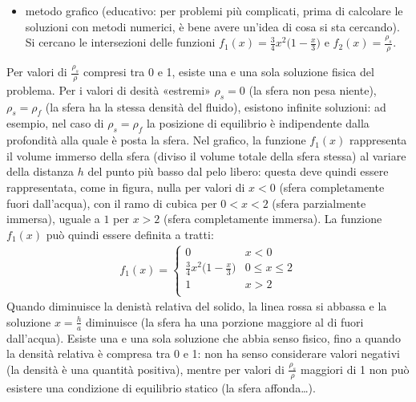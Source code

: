\documentclass[letterpaper,10pt,italian]{jupyterBook}
\begin{document}
\begin{itemize}
\begin{itemize}
\begin{sphinxVerbatim}[commandchars=\\\{\}]
x          res 
1.0000    \PYGZhy{}3.437475e\PYGZhy{}01  
1.4583    \PYGZhy{}2.406993e\PYGZhy{}02  
1.4990    \PYGZhy{}5.841602e\PYGZhy{}04  
1.5000    \PYGZhy{}4.027539e\PYGZhy{}07  
1.5000    \PYGZhy{}1.924017e\PYGZhy{}13
\end{sphinxVerbatim}

\item {} 
\sphinxAtStartPar
metodo grafico (educativo: per problemi più complicati, prima di
calcolare le soluzioni con metodi numerici, è bene avere un’idea
di cosa si sta cercando). Si cercano le intersezioni delle
funzioni \(f_1(x) = \frac{3}{4} x^2 \Big(1 - \frac{x}{3}\Big)\) e
\(f_2(x) = \frac{\rho_s}{\rho}\).

\end{itemize}

\end{itemize}

\sphinxAtStartPar
{} Per valori di \(\frac{\rho_s}{\rho}\) compresi tra 0 e 1,
esiste una e una sola soluzione fisica del problema. Per i valori di
desità «estremi» \(\rho_s = 0\) (la sfera non pesa niente),
\(\rho_s = \rho_f\) (la sfera ha la stessa densità del fluido), esistono
infinite soluzioni: ad esempio, nel caso di \(\rho_s = \rho_f\) la
posizione di equilibrio è indipendente dalla profondità alla quale è
posta la sfera. Nel grafico, la funzione \(f_1(x)\) rappresenta il volume
immerso della sfera (diviso il volume totale della sfera stessa) al
variare della distanza \(h\) del punto più basso dal pelo libero: questa
deve quindi essere rappresentata, come in figura, nulla per valori di
\(x<0\) (sfera completamente fuori dall’acqua), con il ramo di cubica per
\(0<x<2\) (sfera parzialmente immersa), uguale a \(1\) per \(x>2\) (sfera
completamente immersa). La funzione \(f_1(x)\) può quindi essere definita
a tratti:
\begin{equation*}
\begin{split}f_1(x) = 
 \begin{cases}
   0 &    x < 0 \\
   \frac{3}{4} x^2 \Big(1 - \frac{x}{3}\Big) &    0 \leq x \leq 2 \\
   1 &   x > 2 \\
 \end{cases}\end{split}
\end{equation*}
\sphinxAtStartPar
{} Quando diminuisce la denistà relativa del
solido, la linea rossa si abbassa e la soluzione \(x=\frac{h}{a}\)
diminuisce (la sfera ha una porzione maggiore al di fuori dall’acqua).
Esiste una e una sola soluzione che abbia senso fisico, fino a quando la
densità relativa è compresa tra 0 e 1: non ha senso considerare valori
negativi (la densità è una quantità positiva), mentre per valori di
\(\frac{\rho_s}{\rho}\) maggiori di 1 non può esistere una condizione di
equilibrio statico (la sfera affonda…).
\end{document}
